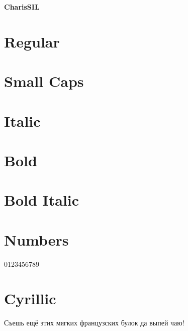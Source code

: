 \documentclass{article}
\begin{document}
\thispagestyle{empty}

\begin{center}\huge\bf CharisSIL
\end{center}


\section*{Regular}
\lipsum[1]

\section*{Small Caps}
\textsc{\lipsum[1]}

\section*{Italic}
\textit{\lipsum[2]}

\section*{Bold}

\textbf{\lipsum[3]}

\section*{Bold Italic}


\textbf{\textit{\lipsum[4]}}

\section*{Numbers}

0123456789

\section*{Cyrillic}


{\ifxetex\else\ifluatex\else{}\selectfont\fi\fi
Съешь ещё этих мягких французских булок да
выпей чаю!}
\end{document}
